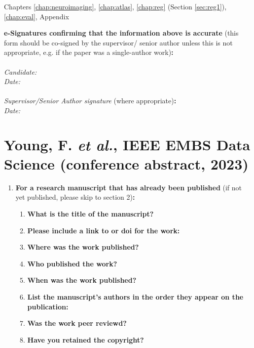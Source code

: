 \documentclass[12pt,phd,a4paper,twoside]{ucl_thesis}
\begin{document}
{\begin{enumerate}[leftmargin=*,label={\bfseries\arabic*.}]
	Chapters \ref{chap:neuroimaging}, \ref{chap:atlas}, \ref{chap:reg} (Section \ref{sec:reg1}), \ref{chap:eval}, Appendix
	\end{enumerate}

	\textbf{e-Signatures confirming that the information above is accurate}
	(this form should be co-signed by the supervisor/ senior author unless this is not appropriate, e.g. if the paper was a single-author work)\textbf{:}\\
	\\[\baselineskip]
	\textit{Candidate:}
	\\[\baselineskip]
	\textit{Date:}\\\signdate
\\[\baselineskip]
	\textit{Supervisor/Senior Author signature} (where appropriate)\textbf{:}
	\\[\baselineskip]
	\textit{Date:}\\\signdate

\section*{Young, F. \textit{et al.}, IEEE EMBS Data Science (conference abstract, 2023)}
\begin{enumerate}[leftmargin=*,label={\bfseries\arabic*.}]\itemsep0em
\item \textbf{For a research manuscript that has already been published} (if not yet published, please skip to section 2)\textbf{:}
\begin{enumerate}[label={\alph*)}]\itemsep0em
\item \textbf{What is the title of the manuscript?}

	\item \textbf{Please include a link to or doi for the work:}

	\item \textbf{Where was the work published?}

	\item \textbf{Who published the work?}

	\item \textbf{When was the work published?}

	\item \textbf{List the manuscript's authors in the order they appear on the publication:}

	\item \textbf{Was the work peer reviewd?}

	\item \textbf{Have you retained the copyright?}


\end{enumerate}
\end{enumerate}}
\end{document}

